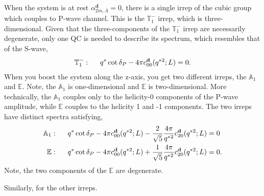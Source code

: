 When the system is at rest $\alpha_{2m,\Lambda}^\mathbf{d}=0$, there is a single irrep of the cubic group which couples to P-wave channel. This is the $\mathbb{T}_1^-$ irrep, which is three-dimensional. Given that the three-components of the $\mathbb{T}_1^-$ irrep are necessarily degenerate, only one QC is needed to describe its spectrum, which resembles that of the S-wave,
\begin{align}
\mathbb{T}_1^-:\hspace{.5cm} q^{*}\cot\delta_{P}-
{4\pi}
 c^\mathbf{d}_{00}(q^{*2};L)=0.
\end{align}
When you boost the system along the z-axis, you get two different irreps, the $\mathbb{A}_1$ and $\mathbb{E}$. Note, the $\mathbb{A}_1$ is one-dimensional and $\mathbb{E}$ is two-dimensional. More technically, the $\mathbb{A}_1$ couples only to the helicity-0 components of the P-wave amplitude, while $\mathbb{E}$ couples to the helicity 1 and -1 components. The two irreps have  distinct spectra satisfying,
\begin{align}
\mathbb{A}_1&:\hspace{.5cm}q^{*}\cot\delta_{P}-
{4\pi}
 c^\mathbf{d}_{00}(q^{*2};L)
 -
\frac{2}{\sqrt{5}}\frac{4\pi}{q^{*2}}
 c^\mathbf{d}_{20}(q^{*2};L)=0\\
\mathbb{E}&:\hspace{.5cm}q^{*}\cot\delta_{P}-
{4\pi}
 c^\mathbf{d}_{00}(q^{*2};L)
 +
\frac{1}{\sqrt{5}}\frac{4\pi}{q^{*2}}
 c^\mathbf{d}_{20}(q^{*2};L)=0. 
\end{align}
Note, the two components of the $\mathbb{E}$ are degenerate. 

Similarly, for the other irreps. 
